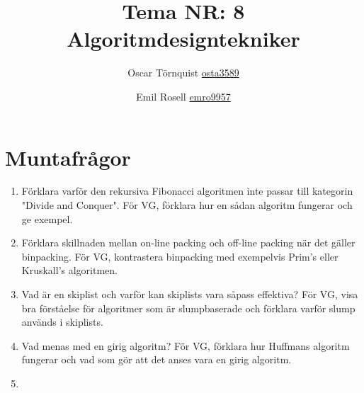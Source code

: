 \documentclass[a5paper,10pt,oneside]{article}
\title{Tema NR: 8 Algoritmdesigntekniker}
\author{Oscar Törnquist \url{osta3589} \and Emil Rosell \url{emro9957}}
\begin{document}
\maketitle

\section*{Muntafrågor}
\begin{enumerate}
\item Förklara varför den rekursiva Fibonacci algoritmen inte passar till kategorin "Divide and Conquer". För VG, förklara hur en sådan algoritm fungerar och ge exempel.

\item Förklara skillnaden mellan on-line packing och off-line packing när det gäller binpacking. För VG, kontrastera binpacking med exempelvis Prim's eller Kruskall's algoritmen.

\item Vad är en skiplist och varför kan skiplists vara såpass effektiva? För VG, visa bra förståelse för algoritmer som är slumpbaserade och förklara varför slump används i skiplists.
\item
Vad menas med en girig algoritm? För VG, förklara hur Huffmans algoritm fungerar och vad som gör att det anses vara en girig algoritm.
\item



\end{enumerate}
\end{document}

